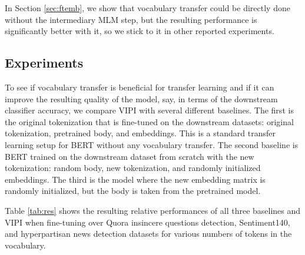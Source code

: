 \documentclass[review]{elsarticle}
\begin{document}
 In Section \ref{sec:ftemb}, we show that vocabulary transfer could be directly done without the intermediary MLM step, but the resulting performance is significantly better with it, so we stick to it in other reported experiments.

\subsection{Experiments}

To see if vocabulary transfer is beneficial for transfer learning and if it can improve the resulting quality of the model, say, in terms of the downstream classifier accuracy, we compare VIPI with several different baselines. The first is the original tokenization that is fine-tuned on the downstream datasets: original tokenization, pretrained body, and embeddings. This is a standard transfer learning setup for BERT without any vocabulary transfer. The second baseline is BERT trained on the downstream dataset from scratch with the new tokenization: random body, new tokenization, and randomly initialized embeddings. The third is the model where the new embedding matrix is randomly initialized, but the body is taken from the pretrained model.  

Table \ref{tab:res} shows the resulting relative performances of all three baselines and VIPI when fine-tuning over Quora insincere questions detection, Sentiment140, and hyperpartisan news detection datasets for various numbers of tokens in the vocabulary.
\end{document}
